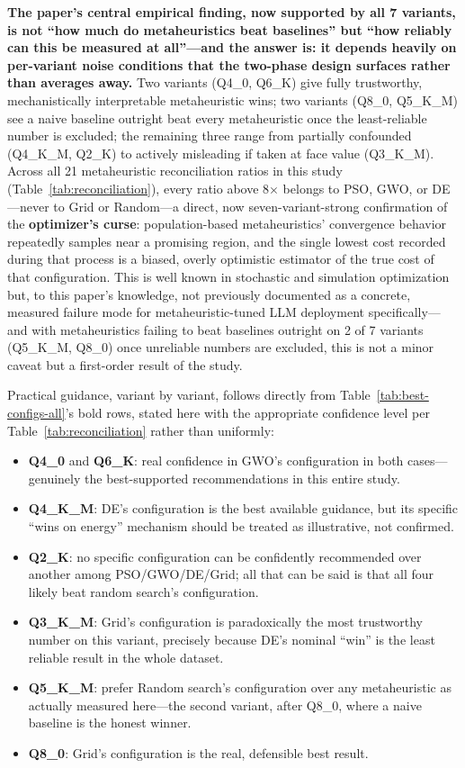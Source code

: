 \documentclass[journal]{IEEEtran}
\begin{document}
\textbf{The paper's central empirical finding, now supported by all 7 variants, is not ``how much do metaheuristics beat baselines'' but ``how reliably can this be measured at all''---and the answer is: it depends heavily on per-variant noise conditions that the two-phase design surfaces rather than averages away.} Two variants (Q4\_0, Q6\_K) give fully trustworthy, mechanistically interpretable metaheuristic wins; two variants (Q8\_0, Q5\_K\_M) see a naive baseline outright beat every metaheuristic once the least-reliable number is excluded; the remaining three range from partially confounded (Q4\_K\_M, Q2\_K) to actively misleading if taken at face value (Q3\_K\_M). Across all 21 metaheuristic reconciliation ratios in this study (Table~\ref{tab:reconciliation}), every ratio above 8$\times$ belongs to PSO, GWO, or DE---never to Grid or Random---a direct, now seven-variant-strong confirmation of the \textbf{optimizer's curse}: population-based metaheuristics' convergence behavior repeatedly samples near a promising region, and the single lowest cost recorded during that process is a biased, overly optimistic estimator of the true cost of that configuration. This is well known in stochastic and simulation optimization but, to this paper's knowledge, not previously documented as a concrete, measured failure mode for metaheuristic-tuned LLM deployment specifically---and with metaheuristics failing to beat baselines outright on 2 of 7 variants (Q5\_K\_M, Q8\_0) once unreliable numbers are excluded, this is not a minor caveat but a first-order result of the study.

Practical guidance, variant by variant, follows directly from Table~\ref{tab:best-configs-all}'s bold rows, stated here with the appropriate confidence level per Table~\ref{tab:reconciliation} rather than uniformly:
\begin{itemize}
  \item \textbf{Q4\_0} and \textbf{Q6\_K}: real confidence in GWO's configuration in both cases---genuinely the best-supported recommendations in this entire study.
  \item \textbf{Q4\_K\_M}: DE's configuration is the best available guidance, but its specific ``wins on energy'' mechanism should be treated as illustrative, not confirmed.
  \item \textbf{Q2\_K}: no specific configuration can be confidently recommended over another among PSO/GWO/DE/Grid; all that can be said is that all four likely beat random search's configuration.
  \item \textbf{Q3\_K\_M}: Grid's configuration is paradoxically the most trustworthy number on this variant, precisely because DE's nominal ``win'' is the least reliable result in the whole dataset.
  \item \textbf{Q5\_K\_M}: prefer Random search's configuration over any metaheuristic as actually measured here---the second variant, after Q8\_0, where a naive baseline is the honest winner.
  \item \textbf{Q8\_0}: Grid's configuration is the real, defensible best result.
\end{itemize}
\end{document}
